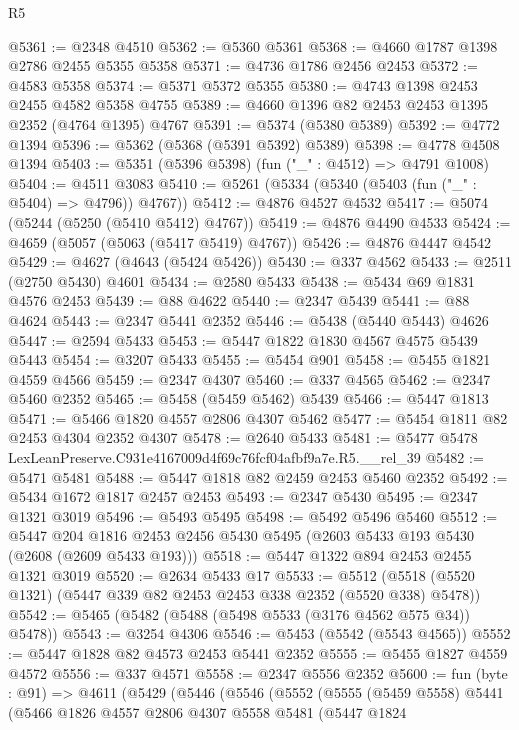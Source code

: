 \begin{lexlean}{R5}
\begin{coremodule}
@5361 := @2348 @4510
@5362 := @5360 @5361
@5368 := @4660 @1787 @1398 @2786 @2455 @5355 @5358
@5371 := @4736 @1786 @2456 @2453
@5372 := @4583 @5358
@5374 := @5371 @5372 @5355
@5380 := @4743 @1398 @2453 @2455 @4582 @5358 @4755
@5389 := @4660 @1396 @82 @2453 @2453 @1395 @2352 (@4764 @1395) @4767
@5391 := @5374 (@5380 @5389)
@5392 := @4772 @1394
@5396 := @5362 (@5368 (@5391 @5392) @5389)
@5398 := @4778 @4508 @1394
@5403 := @5351 (@5396 @5398) (fun ("_" : @4512) => @4791 @1008)
@5404 := @4511 @3083
@5410 := @5261 (@5334 (@5340 (@5403 (fun ("_" : @5404) => @4796)) @4767))
@5412 := @4876 @4527 @4532
@5417 := @5074 (@5244 (@5250 (@5410 @5412) @4767))
@5419 := @4876 @4490 @4533
@5424 := @4659 (@5057 (@5063 (@5417 @5419) @4767))
@5426 := @4876 @4447 @4542
@5429 := @4627 (@4643 (@5424 @5426))
@5430 := @337 @4562
@5433 := @2511 (@2750 @5430) @4601
@5434 := @2580 @5433
@5438 := @5434 @69 @1831 @4576 @2453
@5439 := @88 @4622
@5440 := @2347 @5439
@5441 := @88 @4624
@5443 := @2347 @5441 @2352
@5446 := @5438 (@5440 @5443) @4626
@5447 := @2594 @5433
@5453 := @5447 @1822 @1830 @4567 @4575 @5439 @5443
@5454 := @3207 @5433
@5455 := @5454 @901
@5458 := @5455 @1821 @4559 @4566
@5459 := @2347 @4307
@5460 := @337 @4565
@5462 := @2347 @5460 @2352
@5465 := @5458 (@5459 @5462) @5439
@5466 := @5447 @1813
@5471 := @5466 @1820 @4557 @2806 @4307 @5462
@5477 := @5454 @1811 @82 @2453 @4304 @2352 @4307
@5478 := @2640 @5433
@5481 := @5477 @5478 LexLeanPreserve.C931e4167009d4f69c76fcf04afbf9a7e.R5.__rel_39
@5482 := @5471 @5481
@5488 := @5447 @1818 @82 @2459 @2453 @5460 @2352
@5492 := @5434 @1672 @1817 @2457 @2453
@5493 := @2347 @5430
@5495 := @2347 @1321 @3019
@5496 := @5493 @5495
@5498 := @5492 @5496 @5460
@5512 := @5447
    @204
    @1816
    @2453
    @2456
    @5430
    @5495
    (@2603 @5433 @193 @5430 (@2608 (@2609 @5433 @193)))
@5518 := @5447 @1322 @894 @2453 @2455 @1321 @3019
@5520 := @2634 @5433 @17
@5533 := @5512 (@5518 (@5520 @1321) (@5447 @339 @82 @2453 @2453 @338 @2352 (@5520 @338) @5478))
@5542 := @5465 (@5482 (@5488 (@5498 @5533 (@3176 @4562 @575 @34)) @5478))
@5543 := @3254 @4306
@5546 := @5453 (@5542 (@5543 @4565))
@5552 := @5447 @1828 @82 @4573 @2453 @5441 @2352
@5555 := @5455 @1827 @4559 @4572
@5556 := @337 @4571
@5558 := @2347 @5556 @2352
@5600 := fun (byte : @91) =>
  @4611
    (@5429
      (@5446
        (@5546
          (@5552
            (@5555
              (@5459 @5558)
              @5441
              (@5466
                @1826
                @4557
                @2806
                @4307
                @5558
                @5481
                (@5447
                  @1824

\end{coremodule}
\end{lexlean}
